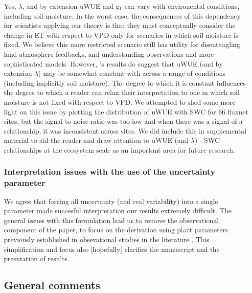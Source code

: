 \documentclass[12pt]{article}
\begin{document}
Yes, $\lambda$, and by extension uWUE and g$_1$ can vary with
environental conditions, including soil moisture. In the worst case,
the consequences of this dependency for scientists applying our theory
is that they must conceptually consider the change in ET with respect
to VPD only for scenarios in which soil moisture is fixed. We believe
this more restricted scenario still has utility for disentangling land
atmosphere feedbacks, and understanding observations and more
sophisticated models. However, \cite{Zhou_2015}'s results do suggest
that uWUE (and by extension $\lambda$) may be somewhat constant with
across a range of conditions (including implicitly soil moisture). The
degree to which it is constant influences the degree to which a reader
can relax their interpretation to one in which soil moisture is not
fixed with respect to VPD. We attempted to shed some more light on
this issue by plotting the distribution of uWUE with SWC for 66
fluxnet sites, but the signal to noise ratio was too low and when
there was a signal of a relationship, it was inconsistent across
sites. We did include this in supplemental material to aid the reader
and draw attention to uWUE (and $\lambda$) - SWC relationships at the
ecosystem scale as an important area for future research.

\subsubsection{Interpretation issues with the use of the uncertainty
  parameter}

We agree that forcing all uncertainty (and real variability) into a
single parameter made succesful interpretation our results extremely
difficult. The general issues with this formulation lead us to remove
the observational component of the paper, to focus on the derivation
using plant parameters previously established in obsevational studies
in the literature \citep{Zhou_2015, Medlyn_2017}. This simplification
and focus also [hopefully] clarifies the manuscript and the
presntation of results.

\subsection{General comments}
\end{document}
